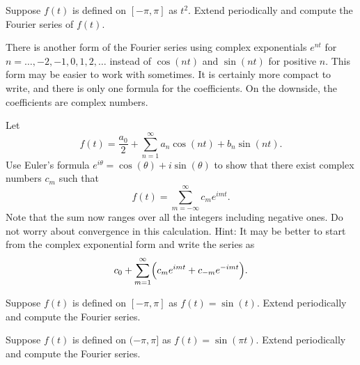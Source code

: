 \begin{exercise}
Suppose $f(t)$ is defined on $[-\pi,\pi]$ as $t^2$.
Extend periodically and compute the Fourier series of $f(t)$.
\end{exercise}

There is another form of the Fourier series using complex exponentials
$e^{nt}$ for $n=\ldots,-2,-1,0,1,2,\ldots$ instead of
$\cos(nt)$ and $\sin(nt)$ for positive $n$.  This form may be easier
to work with sometimes.  It is certainly more compact to write,
and there is only one formula for the coefficients.  On the downside,
the coefficients are complex numbers.

\begin{exercise}
\begin{samepage}
Let 
\begin{equation*}
f(t) = \frac{a_0}{2} + \sum_{n=1}^\infty a_n \cos (n t)
+ b_n \sin (n t) .
\end{equation*}
Use Euler's formula $e^{i\theta} = \cos (\theta) + i \sin (\theta)$ to
show that there exist complex numbers $c_m$ such that
\begin{equation*}
f(t) = 
\sum_{m=-\infty}^\infty c_m e^{imt} .
\end{equation*}
Note that the sum now ranges over all the integers including negative ones.
Do not worry about convergence in this calculation.
Hint: It may be better to start from the complex exponential form and write
the series as
\begin{equation*}
c_0 + \sum_{m=1}^\infty \Bigl( c_m e^{imt} + c_{-m} e^{-imt}  \Bigr).
\end{equation*}
\end{samepage}
\end{exercise}

\setcounter{exercise}{100}

\begin{exercise}
Suppose $f(t)$ is defined on $[-\pi,\pi]$ as $f(t) = \sin(t)$.  Extend
periodically and compute the Fourier series.
\end{exercise}

\begin{exercise}
Suppose $f(t)$ is defined on $(-\pi,\pi]$ as $f(t) = \sin(\pi t)$.  Extend
periodically and compute the Fourier series.
\end{exercise}

